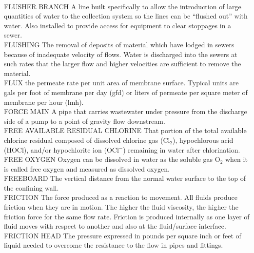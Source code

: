 \vspace{0.3cm}\\
FLUSHER BRANCH
A line built specifically to allow the introduction of large quantities of water to the collection system so the lines can be “flushed out” with water. Also installed to provide access for equipment to clear stoppages in a sewer. 
\vspace{0.3cm}\\
FLUSHING
The removal of deposits of material which have lodged in sewers because of inadequate velocity of flows. Water is discharged into the sewers at such rates that the larger flow and higher velocities are sufficient to remove the material. 
\vspace{0.3cm}\\
FLUX
the permeate rate per unit area of membrane surface. Typical units are gals per foot of membrane per day (gfd) or liters of permeate per square meter of membrane per hour (lmh).
\vspace{0.3cm}\\
FORCE MAIN
A pipe that carries wastewater under pressure from the discharge side of a pump to a point of gravity flow downstream.
\vspace{0.3cm}\\
FREE AVAILABLE RESIDUAL CHLORINE
That portion of the total available chlorine residual composed of dissolved chlorine gas (Cl$_2$), hypochlorous acid (HOCl), and/or hypochlorite ion (OCl$^-$) remaining in water after chlorination.
\vspace{0.3cm}\\
FREE OXYGEN
Oxygen can be dissolved in water as the soluble gas O$_2$ when it is called free oxygen and measured as dissolved oxygen.
\vspace{0.3cm}\\
FREEBOARD
The vertical distance from the normal water surface to the top of the confining wall.
\vspace{0.3cm}\\
FRICTION
The force produced as a reaction to movement. All fluids produce friction when they are in motion. The higher the fluid viscosity, the higher the friction force for the same flow rate. Friction is produced internally as one layer of fluid moves with respect to another and also at the fluid/surface interface.
\vspace{0.3cm}\\
FRICTION HEAD
The pressure expressed in pounds per square inch or feet of liquid needed to overcome the resistance to the flow in pipes and fittings.
